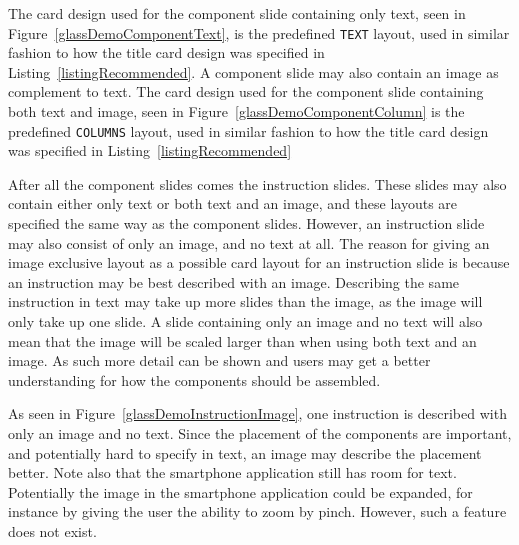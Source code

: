 The card design used for the component slide containing only text, seen in Figure~\ref{glassDemoComponentText}, is the predefined \texttt{TEXT} layout, used in similar fashion to how the title card design was specified in Listing~\ref{listingRecommended}. A component slide may also contain an image as complement to text. The card design used for the component slide containing both text and image, seen in Figure~\ref{glassDemoComponentColumn} is the predefined \texttt{COLUMNS} layout, used in similar fashion to how the title card design was specified in Listing~\ref{listingRecommended}

After all the component slides comes the instruction slides. These slides may also contain either only text or both text and an image, and these layouts are specified the same way as the component slides. However, an instruction slide may also consist of only an image, and no text at all. The reason for giving an image exclusive layout as a possible card layout for an instruction slide is because an instruction may be best described with an image. Describing the same instruction in text may take up more slides than the image, as the image will only take up one slide. A slide containing only an image and no text will also mean that the image will be scaled larger than when using both text and an image. As such more detail can be shown and users may get a better understanding for how the components should be assembled.

As seen in Figure~\ref{glassDemoInstructionImage}, one instruction is described with only an image and no text. Since the placement of the components are important, and potentially hard to specify in text, an image may describe the placement better. Note also that the smartphone application still has room for text. Potentially the image in the smartphone application could be expanded, for instance by giving the user the ability to zoom by pinch. However, such a feature does not exist.

